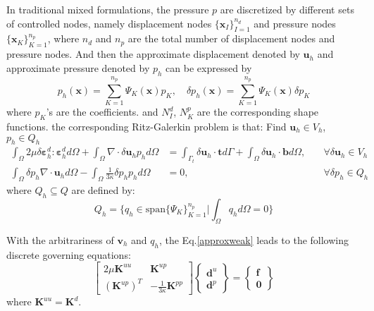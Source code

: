 In traditional mixed formulations, the pressure $p$ are discretized by different sets of controlled nodes, namely displacement nodes $\{\boldsymbol x_I\}_{I=1}^{n_d}$ and pressure nodes $\{\boldsymbol x_K\}_{K=1}^{n_p}$, where $n_d$ and $n_p$ are the total number of displacement nodes and pressure nodes. And then the approximate displacement denoted by $\boldsymbol u_h$ and approximate pressure denoted by $p_h$ can be expressed by  
\begin{equation}\label{p_h}
    p_h(\boldsymbol x) = \sum_{K=1}^{n_p} \Psi_K(\boldsymbol x) p_K, \quad
    \delta p_h(\boldsymbol x) = \sum_{K=1}^{n_p} \Psi_K(\boldsymbol x) \delta p_K
\end{equation}
where $p_K$'s are the coefficients. and $N_I^d$, $N_K^p$ are the corresponding shape functions.
the corresponding Ritz-Galerkin problem is that:
Find $\boldsymbol u_h \in V_h$, $p_h \in Q_h$
\begin{subequations}\label{ritz_mix}
\begin{alignat}{2}
\label{ritz_mix_1}
\int_\Omega 2\mu \delta \boldsymbol \varepsilon^d_h : \boldsymbol \varepsilon^d_h d\Omega +
\int_\Omega \nabla \cdot \delta \boldsymbol u_h p_h d\Omega &=
\int_{\Gamma_t} \delta \boldsymbol u_h \cdot \boldsymbol t d\Gamma + \int_\Omega \delta \boldsymbol u_h \cdot \boldsymbol b d\Omega, \quad
&\forall \delta \boldsymbol u_h \in V_h \\
\label{ritz_mix_2}
\int_\Omega \delta p_h \nabla \cdot \boldsymbol u_h d\Omega - \int_\Omega \frac{1}{3\kappa} \delta p_h p_h d\Omega &= 0, &\forall \delta p_h \in Q_h
\end{alignat}
\end{subequations}
where $Q_h \subseteq Q$ are defined by:
\begin{equation}
Q_h = \{q_h \in \mathrm{span}\{\Psi_K\}_{K=1}^{n_p} \vert \int_{\Omega} q_h d\Omega = 0\}
\end{equation}

With the arbitrariness of $\boldsymbol v_h$ and $q_h$, the Eq.\eqref{approxweak} leads to the following discrete governing equations:
\begin{equation}\label{equilibrium_mix}
    \begin{bmatrix}
        2\mu\boldsymbol K^{uu} & \boldsymbol K^{up} \\ (\boldsymbol K^{up})^T & -\frac{1}{3\kappa}\boldsymbol K^{pp}
    \end{bmatrix}
    \begin{Bmatrix}
        \boldsymbol d^u \\ \boldsymbol d^p 
    \end{Bmatrix} =
    \begin{Bmatrix}
        \boldsymbol f \\ \boldsymbol 0 
    \end{Bmatrix}
\end{equation}
where $\boldsymbol K^{uu} = \boldsymbol K^d$. 

